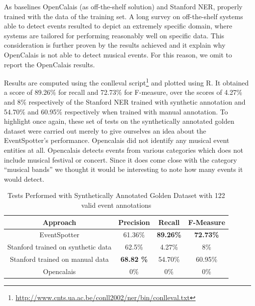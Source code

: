\documentclass[10pt,a4paper]{article}
\begin{document}
As baselines OpenCalais (as off-the-shelf solution) and Stanford NER, properly trained with the data of the training set. A long survey on off-the-shelf systems able to detect events resulted to depict an extremely specific domain, where systems are tailored for performing reasonably well on specific data. This consideration is further proven by the results achieved and it explain why OpenCalais is not able to detect musical events. For this reason, we omit to report the OpenCalais results.

Results are computed using the conlleval script\footnote{\url{http://www.cnts.ua.ac.be/conll2002/ner/bin/conlleval.txt}} and plotted using R. It obtained a score of 89.26\% for recall and 72.73\% for F-measure, over the scores of 4.27\% and 8\% respectively of the Stanford NER trained with synthetic annotation and 54.70\% and 60.95\% respectively when trained with manual annotation. To highlight once again, these set of tests on the synthetically annotated golden dataset were carried out merely to give ourselves an idea about the EventSpotter's performance. Opencalais did not identify any musical event entities at all. Opencalais detects events from various categories which does not include musical festival or concert. Since it does come close with the category ``musical bands'' we thought it would be interesting to note how many events it would detect.
\begin{table}[ht]
\centering %
\begin{tabular}{c c c c} %
\hline\hline %
Approach & Precision & Recall & F-Measure \\ [0.5ex] %
\hline %
EventSpotter & 61.36\% & \bf 89.26\% \bf & \bf 72.73\% \bf \\ %
Stanford trained on synthetic data & 62.5\% & 4.27\% & 8\%\\
Stanford trained on manual data & \bf 68.82 \bf \% & 54.70\% & 60.95\% \\
Opencalais & 0\% & 0\% & 0\% \\
\hline %
\end{tabular}
\caption{Tests Performed with Synthetically Annotated Golden Dataset with 122 valid event annotations} %
\label{table:nonlin} %
\end{table}
\end{document}
